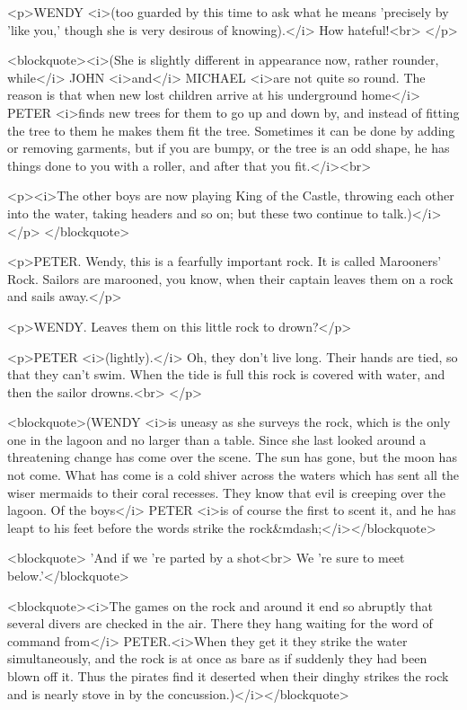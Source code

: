 <p>WENDY <i>(too guarded by this time to ask what he means 'precisely
by 'like you,' though she is very desirous of knowing).</i> How
hateful!<br>
</p>

<blockquote><i>(She is slightly different in appearance now, rather
rounder, while</i> JOHN <i>and</i> MICHAEL <i>are not quite so round.
The reason is that when new lost children arrive at his underground
home</i> PETER <i>finds new trees for them to go up and down by, and
instead of fitting the tree to them he makes them fit the tree.
Sometimes it can be done by adding or removing garments, but if you
are bumpy, or the tree is an odd shape, he has things done to you
with a roller, and after that you fit.</i><br>
 

<p><i>The other boys are now playing King of the Castle, throwing
each other into the water, taking headers and so on; but these two
continue to talk.)</i></p>
</blockquote>

<p>PETER. Wendy, this is a fearfully important rock. It is called
Marooners' Rock. Sailors are marooned, you know, when their captain
leaves them on a rock and sails away.</p>

<p>WENDY. Leaves them on this little rock to drown?</p>

<p>PETER <i>(lightly).</i> Oh, they don't live long. Their hands are
tied, so that they can't swim. When the tide is full this rock is
covered with water, and then the sailor drowns.<br>
</p>

<blockquote>(WENDY <i>is uneasy as she surveys the rock, which is the
only one in the lagoon and no larger than a table. Since she last
looked around a threatening change has come over the scene. The sun
has gone, but the moon has not come. What has come is a cold shiver
across the waters which has sent all the wiser mermaids to their
coral recesses. They know that evil is creeping over the lagoon. Of
the boys</i> PETER <i>is of course the first to scent it, and he has
leapt to his feet before the words strike the
rock&mdash;</i></blockquote>

<blockquote>    'And if we 're parted by a shot<br>
    We 're sure to meet below.'</blockquote>

<blockquote><i>The games on the rock and around it end so abruptly
that several divers are checked in the air. There they hang waiting
for the word of command from</i> PETER.<i>When they get it they
strike the water simultaneously, and the rock is at once as bare as
if suddenly they had been blown off it. Thus the pirates find it
deserted when their dinghy strikes the rock and is nearly stove in by
the concussion.)</i></blockquote>

